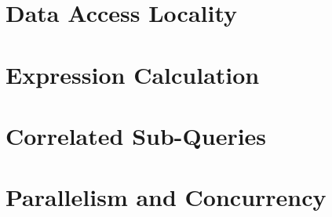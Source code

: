 







\section{Data Access Locality}






\section{Expression Calculation}






\section{Correlated Sub-Queries}






\section{Parallelism and Concurrency}

